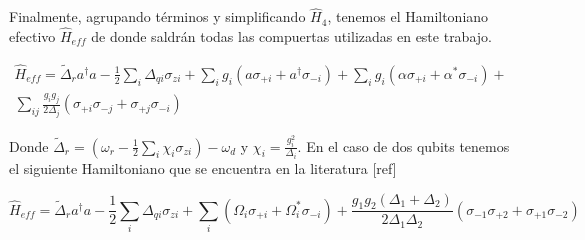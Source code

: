 Finalmente, agrupando términos y simplificando $\hat{H}_4$, tenemos el Hamiltoniano efectivo $\hat{H}_{eff}$ de donde saldrán todas las compuertas utilizadas en este trabajo.

\begin{multline}
\hat{H}_{eff} = \tilde{\Delta}_r a^\dagger a - \frac{1}{2} \sum\limits_i \Delta_{qi} \sigma_{zi} + \sum\limits_i g_i (a \sigma_{+i} + a^\dagger \sigma_{-i}) + \sum\limits_i g_i (\alpha \sigma_{+i} + \alpha^* \sigma_{-i}) + \\
\sum\limits_{ij} \frac{g_i g_j}{2 \Delta_j} \left(\sigma_{+i} \sigma_{-j} + \sigma_{+j} \sigma_{-i}\right)
\end{multline}

Donde $\tilde{\Delta}_r = (\omega_r - \frac{1}{2} \sum\limits_i \chi_i \sigma_{zi}) - \omega_d$ y $\chi_i = \frac{g_i^2}{\Delta_i}$. En el caso de dos qubits tenemos el siguiente Hamiltoniano que se encuentra en la literatura [ref]

\begin{equation}
    \hat{H}_{eff} = \tilde{\Delta}_r a^\dagger a - \frac{1}{2} \sum\limits_i \Delta_{qi} \sigma_{zi} + \sum\limits_i (\Omega_i \sigma_{+i} + \Omega_i^* \sigma_{-i})
+ \frac{g_1 g_2 (\Delta_1 + \Delta_2)}{2 \Delta_1 \Delta_2} (\sigma_{-1} \sigma_{+2}+\sigma_{+1} \sigma_{-2})
\end{equation}

